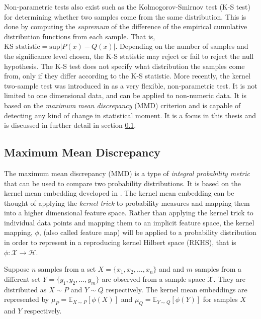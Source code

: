 
Non-parametric tests also exist such as the Kolmogorov-Smirnov test (K-S test) for determining whether two samples come from the same distribution. This is done by computing the \textit{supremum} of the difference of the empirical cumulative distribution functions from each sample. That is, $\text{KS statistic} =\text{sup} |P(x) - Q(x)|$. Depending on the number of samples and the significance level chosen, the K-S statistic may reject or fail to reject the null hypothesis. The K-S test does not specify what distribution the samples come from, only if they differ according to the K-S statistic. More recently, the kernel two-sample test was introduced in \cite{gretton2012kernel} as a very flexible, non-parametric test. It is not limited to one dimensional data, and can be applied to non-numeric data. It is based on the \textit{maximum mean discrepancy} (MMD) criterion and is capable of detecting any kind of change in statistical moment. It is a focus in this thesis and is discussed in further detail in section \ref{mmd}.

\subsection{Maximum Mean Discrepancy}
\label{mmd}
The maximum mean discrepancy (MMD) is a type of \textit{integral probability metric} that can be used to compare two probability distributions. It is based on the kernel mean embedding developed in \cite{smola2007hilbert}. The kernel mean embedding can be thought of applying the \textit{kernel trick} to probability measures and mapping them into a higher dimensional feature space. Rather than applying the kernel trick to individual data points and mapping them to an implicit feature space, the kernel mapping, $\phi$, (also called feature map) will be applied to a probability distribution in order to represent in a reproducing kernel Hilbert space (RKHS), that is $\phi: \mathcal{X} \rightarrow \mathcal{H}$.

Suppose $n$ samples from a set $X = \{x_1, x_2, ..., x_n\}$ and and $m$ samples from a different set $Y=\{y_1, y_2, ..., y_m\}$ are observed from a sample space $\mathcal{X}$. They are distributed as $X \sim  P$ and $Y \sim Q$ respectively. The kernel mean embeddings are represented by $\mu_P = \mathbb{E}_{X \sim P}[\phi(X)] $ and $\mu_Q =\mathbb{E}_{Y \sim Q}[\phi(Y)]$ for samples $X$ and $Y$ respectively. 

